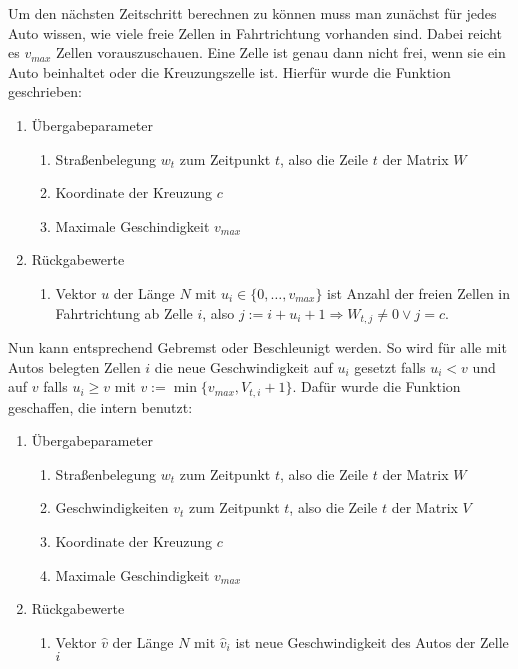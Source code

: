 Um den nächsten Zeitschritt berechnen zu können muss man zunächst für jedes Auto wissen, wie viele freie Zellen 
in Fahrtrichtung vorhanden sind. Dabei reicht es \(v_{max}\) Zellen vorauszuschauen. 
Eine Zelle ist genau dann nicht frei, wenn sie ein Auto beinhaltet oder
die Kreuzungszelle ist. Hierfür wurde die Funktion  geschrieben:
\begin{enumerate}
  \item Übergabeparameter
    \begin{enumerate}
      \item Straßenbelegung \(w_t\) zum Zeitpunkt \(t\),  also die Zeile \(t\) der Matrix \(W\)       
      \item Koordinate der Kreuzung \(c\) 
      \item Maximale Geschindigkeit \(v_{max}\)
    \end{enumerate}
  \item Rückgabewerte
    \begin{enumerate}
      \item Vektor \(u\) der Länge \(N\) mit \(u_i \in \{0, \ldots, v_{max} \}\) ist Anzahl der freien 
        Zellen in Fahrtrichtung ab Zelle \(i\), also \(j := i + u_i + 1 \Rightarrow W_{t,j} \neq 0 \lor j = c\).
    \end{enumerate}
\end{enumerate}
Nun kann entsprechend Gebremst oder Beschleunigt werden. So wird für alle mit Autos belegten Zellen \(i\)
die neue Geschwindigkeit auf \(u_i\) gesetzt falls \(u_i < v\) und auf \(v\) falls \(u_i \geq v\) mit
\( v := \min\{ v_{max}, V_{t,i}+1 \}\).  
Dafür wurde die Funktion  geschaffen, die intern  benutzt:
\begin{enumerate}
  \item Übergabeparameter
    \begin{enumerate}
      \item Straßenbelegung \(w_t\) zum Zeitpunkt \(t\),  also die Zeile \(t\) der Matrix \(W\)       
      \item Geschwindigkeiten \(v_t\) zum Zeitpunkt \(t\),  also die Zeile \(t\) der Matrix \(V\)       
      \item Koordinate der Kreuzung \(c\) 
      \item Maximale Geschindigkeit \(v_{max}\)
    \end{enumerate}
  \item Rückgabewerte
    \begin{enumerate}
      \item Vektor \(\hat{v}\) der Länge \(N\) mit \(\hat{v}_i\) ist neue Geschwindigkeit des Autos der Zelle \(i\)
    \end{enumerate}
\end{enumerate}
